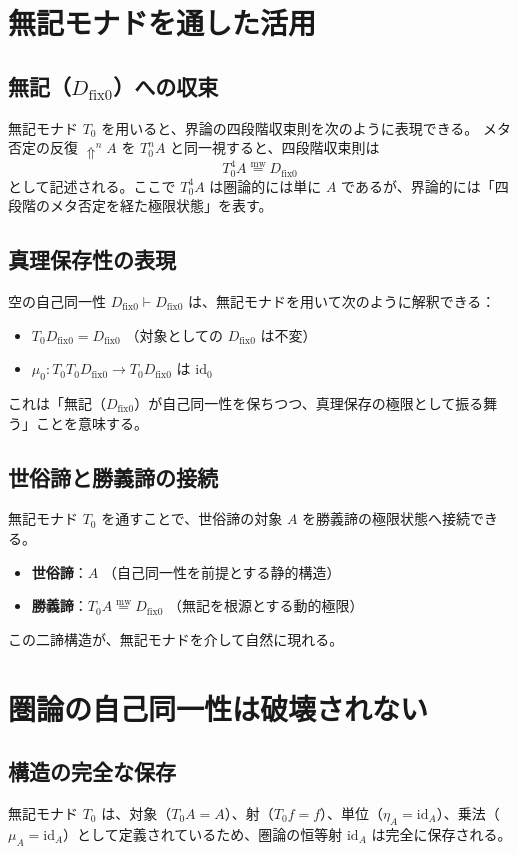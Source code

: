 \documentclass[11pt,a4paper]{article}
\theoremstyle{definition}
\newcommand{\mweq}{\mathrel{\overset{\mathrm{mw}}{=}}}
\newcommand{\dfix}{D_{\mathrm{fix}0}} %
\newcommand{\metanegation}{\Uparrow}     %
\begin{document}
\section{無記モナドを通した活用}

\subsection{無記（$\dfix$）への収束}
無記モナド $T_0$ を用いると、界論の四段階収束則を次のように表現できる。
メタ否定の反復 $\metanegation^n A$ を $T_0^n A$ と同一視すると、四段階収束則は
$$ T_0^4 A \mweq \dfix $$
として記述される。ここで $T_0^4 A$ は圏論的には単に $A$ であるが、界論的には「四段階のメタ否定を経た極限状態」を表す。

\subsection{真理保存性の表現}
空の自己同一性 $\dfix \vdash \dfix$ は、無記モナドを用いて次のように解釈できる：
\begin{itemize}
    \item $T_0 \dfix = \dfix$ （対象としての $\dfix$ は不変）
    \item $\mu_0 : T_0 T_0 \dfix \to T_0 \dfix$ は $\mathrm{id}_0$
\end{itemize}
これは「無記（$\dfix$）が自己同一性を保ちつつ、真理保存の極限として振る舞う」ことを意味する。

\subsection{世俗諦と勝義諦の接続}
無記モナド $T_0$ を通すことで、世俗諦の対象 $A$ を勝義諦の極限状態へ接続できる。
\begin{itemize}
    \item \textbf{世俗諦}：$A$ （自己同一性を前提とする静的構造）
    \item \textbf{勝義諦}：$T_0 A \mweq \dfix$ （無記を根源とする動的極限）
\end{itemize}
この二諦構造が、無記モナドを介して自然に現れる。

\section{圏論の自己同一性は破壊されない}

\subsection{構造の完全な保存}
無記モナド $T_0$ は、対象（$T_0 A = A$）、射（$T_0 f = f$）、単位（$\eta_A = \mathrm{id}_A$）、乗法（$\mu_A = \mathrm{id}_A$）として定義されているため、圏論の恒等射 $\mathrm{id}_A$ は完全に保存される。
\end{document}
